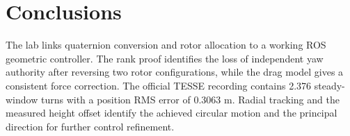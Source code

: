 \documentclass[12pt,a4paper,twoside]{article}
\begin{document}
\section{Conclusions}
The lab links quaternion conversion and rotor allocation to a working ROS geometric controller. The rank proof identifies the loss of independent yaw authority after reversing two rotor configurations, while the drag model gives a consistent force correction. The official TESSE recording contains 2.376 steady-window turns with a position RMS error of 0.3063 m. Radial tracking and the measured height offset identify the achieved circular motion and the principal direction for further control refinement.



\end{document}
